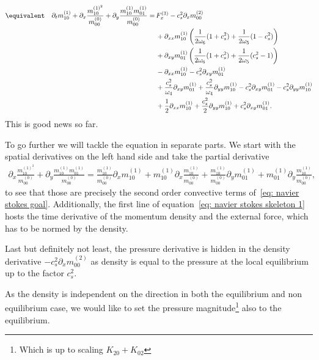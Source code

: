   \begin{align}
    \nonumber
    \equivalent\quad
  \partial_t m_{10}^{(1)}
  + \partial_x \frac{ m_{10}^{{(1)}^2} }{m_{00}^{(0)}}
  + \partial_y \frac{ m_{10}^{(1)}m_{01}^{(1)}}{m_{00}^{(0)}}
  =&\,
  F_x^{(3)}
  - c_s^2 \partial_x  m_{00}^{(2)}
  \\\nonumber &\,
  + \partial_{xx} m_{10}^{(1)} \left(\frac{1}{2\omega_6}(1+c_s^2)
  + \frac{1}{2\omega_5} (1 - c_s^2)\right)
  \\\nonumber &\,
  + \partial_{xy} m_{01}^{(1)} \left(\frac{1}{2\omega_6}(1+c_s^2)
  + \frac{1}{2\omega_5} (c_s^2 - 1)\right)
  \\\nonumber &\,
  - \partial_{xx} m_{10}^{(1)}
  - c_s^2\partial_{xy} m_{01}^{(1)}
  \\\nonumber &\,
  + \frac{c_s^2}{\omega_4}\partial_{xy} m_{01}^{(1)}
  + \frac{c_s^2}{\omega_4}\partial_{yy} m_{10}^{(1)}
  - c_s^2 \partial_{xy} m_{01}^{(1)}
  - c_s^2 \partial_{yy} m_{10}^{(1)}
  \\ &\,
  + \frac{1}{2}\partial_{xx} m_{10}^{(1)}
  + \frac{c_s^2}{2} \partial_{yy} m_{10}^{(1)} + c_s^2\partial_{xy} m_{01}^{(1)}
  .\label{eq: navier stokes skeleton 1}
\end{align}
This is good news so far.

To go further we will tackle the equation in separate parts.
We start with the spatial derivatives on the left hand side and take the partial derivative
\begin{align}
  \label{eq: convective parts}
  \partial_x \frac{ m_{10}^{{(1)}^2} }{m_{00}^{(0)}}
  + \partial_y \frac{ m_{10}^{(1)}m_{01}^{(1)}}{m_{00}^{(0)}}
  =
  \frac{ m_{10}^{{(1)}} }{m_{00}^{(0)}} \partial_x  m_{10}^{{(1)}}
  +  m_{10}^{{(1)}} \partial_x \frac{ m_{10}^{{(1)}} }{m_{00}^{(0)}}
  + \frac{ m_{10}^{(1)}}{m_{00}^{(0)}}\partial_y m_{01}^{(1)}
  + m_{01}^{(1)}\partial_y \frac{ m_{10}^{(1)}}{m_{00}^{(0)}},
\end{align}
to see that those are precisely the second order convective   terms of~\eqref{eq: navier stokes goal}.
Additionally, the first line of equation~\eqref{eq: navier stokes skeleton 1} hosts the time derivative of the momentum density and the external force, which has to be normed by the density.

Last but definitely not least, the pressure derivative is hidden in the density derivative $-c_s^2 \partial_x  m_{00}^{(2)}$ as density is equal to the pressure at the local equilibrium up to the factor $c_s^2$.

As the density is independent on the direction in both the equilibrium and non equilibrium case, we would like to set the pressure magnitude\footnote{Which is up to scaling $K_{20} + K_{02}$} also to the equilibrium.

